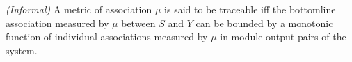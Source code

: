 \documentclass[10pt, onecolumn]{report}
\begin{document}

\begin{definition}\label{def:traceable} \emph{(Informal)}
A metric of association $\mu$ is said to be traceable iff the bottomline association
measured by $\mu$ between $S$ and $Y$ can be bounded by a monotonic function of
individual associations measured by $\mu$ in module-output pairs of the system. 
\end{definition}

%


\end{document}

